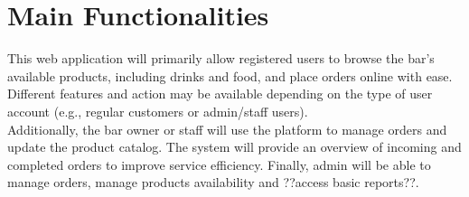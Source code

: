 \section{Main Functionalities}


This web application will primarily allow registered users to browse the bar's available products, including drinks and food, and place orders online with ease.\\
Different features and action may be available depending on the type of user account (e.g., regular customers or admin/staff users).\\
Additionally, the bar owner or staff will use the platform to manage orders and update the product catalog.
The system will provide an overview of incoming and completed orders to improve service efficiency.
Finally, admin will be able to manage orders, manage products availability and ??access basic reports??.
    